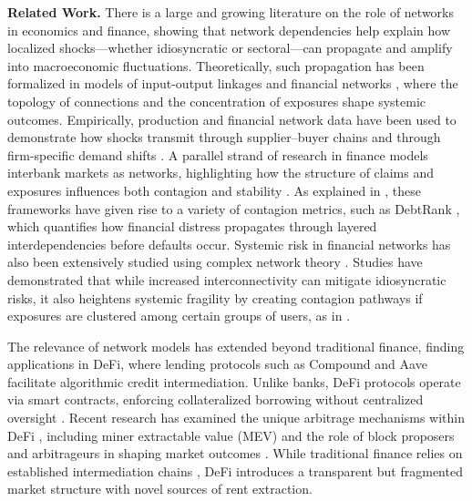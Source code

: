 \documentclass[a4paper,UKenglish,cleveref, autoref, thm-restate]{informs3}
\begin{document}
\medskip


\textbf{Related Work.} There is a large and growing literature on the role of networks in economics and finance, showing that network dependencies help explain how localized shocks---whether idiosyncratic or sectoral---can propagate and amplify into macroeconomic fluctuations. Theoretically, such propagation has been formalized in models of input-output linkages and financial networks \citep{acemoglu2015systemic,gabaix2011granular}, where the topology of connections and the concentration of exposures shape systemic outcomes. Empirically, production and financial network data have been used to demonstrate how shocks transmit through supplier–buyer chains \citep{carvalho2021supply} and through firm-specific demand shifts \citep{digiovanni2014firms}. A parallel strand of research in finance models interbank markets as networks, highlighting how the structure of claims and exposures influences both contagion and stability \citep{allen2000financial,elliott2014financial}. As explained in \cite{glasserman2016contagion}, these frameworks have given rise to a variety of contagion metrics, such as DebtRank \citep{Battiston2012,Battiston2015}, which quantifies how financial distress propagates through layered interdependencies before defaults occur. Systemic risk in financial networks has also been extensively studied using complex network theory \citep{caldarelli2007scale,boss2004network}. Studies have demonstrated that while increased interconnectivity can mitigate idiosyncratic risks, it also heightens systemic fragility by creating contagion pathways if exposures are clustered among certain groups of users, as in \cite{caccioli2009eroding}.

The relevance of network models has extended beyond traditional finance, finding applications in DeFi, where lending protocols such as Compound and Aave facilitate algorithmic credit intermediation. Unlike banks, DeFi protocols operate via smart contracts, enforcing collateralized borrowing without centralized oversight \citep{bartoletti2021lendingsok}. Recent research has examined the unique arbitrage mechanisms within DeFi \citep{daian2020flash,heimbach2024nonatomic}, including miner extractable value (MEV) and the role of block proposers and arbitrageurs in shaping market outcomes \citep{milionis2023automated,azar2024information}. While traditional finance relies on established intermediation chains \citep{green2007dealer,dimaggio2017value,hollifield2017bid}, DeFi introduces a transparent but fragmented market structure with novel sources of rent extraction.
\end{document}

